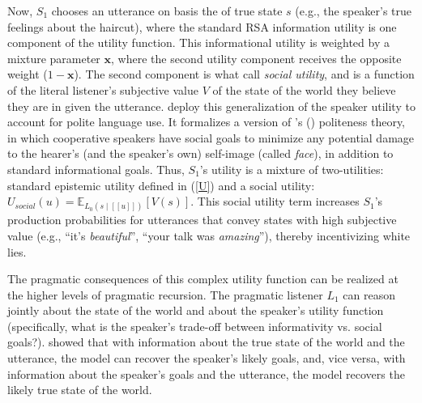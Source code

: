 \documentclass{sp}
\newcommand{\mf}[1]{\textcolor{orange}{[mf: #1]}}
\newcommand{\mht}[1]{\textcolor{purple}{[mht: #1]}}
\newcommand{\sem}[1]{\ensuremath{[\![#1]\!]}}
\begin{document}
Now, $S_1$ chooses an utterance on basis the of true state $s$ (e.g., the speaker's true feelings about the haircut), where the standard RSA information utility is one component of the utility function. 
This informational utility is weighted by a mixture parameter $\textbf{x}$, where the second utility component receives the opposite weight ($1-\textbf{x}$).
The second component is what \cite{yoonetal2016} call \emph{social utility}, and is a function of the literal listener's subjective value $V$ of the state of the world they believe they are in given the utterance.
\cite{yoonetal2016} deploy this generalization of the speaker utility to account for polite language use. 
It formalizes a version of \citeauthor{brown1987politeness}'s (\citeyear{brown1987politeness}) politeness theory, in which cooperative speakers have social goals to minimize any potential damage to the hearer’s (and the speaker’s own) self-image (called \emph{face}), in addition to standard informational goals.
Thus, $S_1$'s utility is a mixture of two-utilities: standard epistemic utility defined in (\ref{U}) and a social utility: $U_{social}(u)  =  \mathbb{E}_{L_0(s \mid \sem{u})}[V(s)]$.
%
This social utility term increases $S_1$'s production probabilities for utterances that convey states with high subjective value (e.g., ``it's \emph{beautiful}'', ``your talk was \emph{amazing}''), thereby incentivizing white lies. 

The pragmatic consequences of this complex utility function can be realized at the higher levels of pragmatic recursion.
The pragmatic listener $L_1$ can reason jointly about the state of the world and about the speaker's utility function (specifically, what is the speaker's trade-off between informativity vs. social goals?). \cite{yoonetal2016} showed that with information about the true state of the world and the utterance, the model can recover the speaker's likely goals, and, vice versa, with information about the speaker's goals and the utterance, the model recovers the likely true state of the world.
\end{document}
